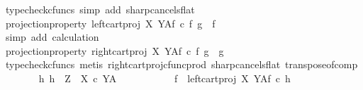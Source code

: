 \begin{isabellebody}
\ {\isacharparenleft}{\kern0pt}typecheck{\isacharunderscore}{\kern0pt}cfuncs{\isacharcomma}{\kern0pt}\ simp\ add{\isacharcolon}{\kern0pt}\ sharp{\isacharunderscore}{\kern0pt}cancels{\isacharunderscore}{\kern0pt}flat{\isacharparenright}{\kern0pt}\isanewline
\ \ \ \ \ \ \isamarkupfalse%
\ \isamarkupfalse%
\ projection{\isacharunderscore}{\kern0pt}property{}{\isacharcolon}{\kern0pt}\ {\isachardoublequoteopen}{\isacharparenleft}{\kern0pt}{\isacharparenleft}{\kern0pt}left{\isacharunderscore}{\kern0pt}cart{\isacharunderscore}{\kern0pt}proj\ X\ Y{\isacharparenright}{\kern0pt}\isactrlbsup A\isactrlesup \isactrlsub f{\isacharparenright}{\kern0pt}\ {\isasymcirc}\isactrlsub c\ {\isasymlangle}f\isactrlsup {\isasymflat}\ {\isacharcomma}{\kern0pt}g\isactrlsup {\isasymflat}{\isasymrangle}\isactrlsup {\isasymsharp}\ {\isacharequal}{\kern0pt}\ f{\isachardoublequoteclose}\isanewline
\ \ \ \ \ \ \ \ \isamarkupfalse%
\ {\isacharparenleft}{\kern0pt}simp\ add{\isacharcolon}{\kern0pt}\ calculation{\isacharparenright}{\kern0pt}\isanewline
\ \ \ \ \ \ \isamarkupfalse%
\ projection{\isacharunderscore}{\kern0pt}property{}{\isacharcolon}{\kern0pt}\ {\isachardoublequoteopen}{\isacharparenleft}{\kern0pt}{\isacharparenleft}{\kern0pt}right{\isacharunderscore}{\kern0pt}cart{\isacharunderscore}{\kern0pt}proj\ X\ Y{\isacharparenright}{\kern0pt}\isactrlbsup A\isactrlesup \isactrlsub f{\isacharparenright}{\kern0pt}\ {\isasymcirc}\isactrlsub c\ {\isasymlangle}f\isactrlsup {\isasymflat}\ {\isacharcomma}{\kern0pt}g\isactrlsup {\isasymflat}{\isasymrangle}\isactrlsup {\isasymsharp}\ {\isacharequal}{\kern0pt}\ g{\isachardoublequoteclose}\isanewline
\ \ \ \ \ \ \ \ \isamarkupfalse%
\ {\isacharparenleft}{\kern0pt}typecheck{\isacharunderscore}{\kern0pt}cfuncs{\isacharcomma}{\kern0pt}\ metis\ right{\isacharunderscore}{\kern0pt}cart{\isacharunderscore}{\kern0pt}proj{\isacharunderscore}{\kern0pt}cfunc{\isacharunderscore}{\kern0pt}prod\ sharp{\isacharunderscore}{\kern0pt}cancels{\isacharunderscore}{\kern0pt}flat\ transpose{\isacharunderscore}{\kern0pt}of{\isacharunderscore}{\kern0pt}comp{\isacharparenright}{\kern0pt}\isanewline
\ \ \ \ \ \ \isamarkupfalse%
\ {\isachardoublequoteopen}{\isasymAnd}h{}{\isachardot}{\kern0pt}\ h{}\ {\isacharcolon}{\kern0pt}\ Z\ {\isasymrightarrow}\ {\isacharparenleft}{\kern0pt}X\ {\isasymtimes}\isactrlsub c\ Y{\isacharparenright}{\kern0pt}\isactrlbsup A\isactrlesup \ {\isasymLongrightarrow}\isanewline
\ \ \ \ \ \ \ \ \ \ f\ {\isacharequal}{\kern0pt}\ left{\isacharunderscore}{\kern0pt}cart{\isacharunderscore}{\kern0pt}proj\ X\ Y\isactrlbsup A\isactrlesup \isactrlsub f\ {\isasymcirc}\isactrlsub c\ h{}\ {\isasymLongrightarrow}\isanewline

\end{isabellebody}
